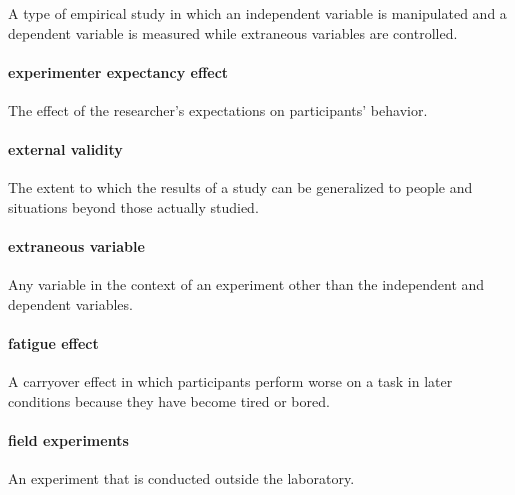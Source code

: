\documentclass[
]{krantz}
\begin{document}
A type of empirical study in which an independent variable is manipulated and a dependent variable is measured while extraneous variables are controlled.

\hypertarget{experimenter-expectancy-effect}{%
\paragraph*{experimenter expectancy effect}\label{experimenter-expectancy-effect}}

The effect of the researcher's expectations on participants' behavior.

\hypertarget{external-validity-1}{%
\paragraph*{external validity}\label{external-validity-1}}

The extent to which the results of a study can be generalized to people and situations beyond those actually studied.

\hypertarget{extraneous-variable}{%
\paragraph*{extraneous variable}\label{extraneous-variable}}

Any variable in the context of an experiment other than the independent and dependent variables.

\hypertarget{fatigue-effect}{%
\paragraph*{fatigue effect}\label{fatigue-effect}}

A carryover effect in which participants perform worse on a task in later conditions because they have become tired or bored.

\hypertarget{field-experiments}{%
\paragraph*{field experiments}\label{field-experiments}}

An experiment that is conducted outside the laboratory.
\end{document}
